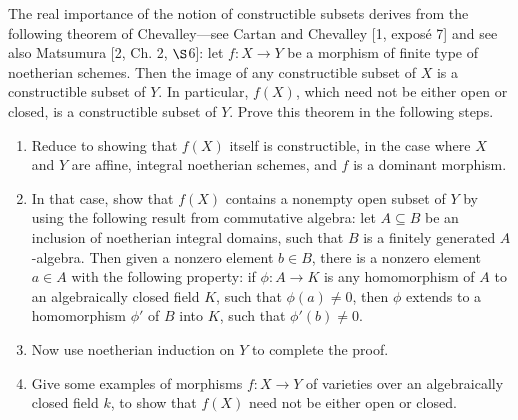 \begin{exercise}%
	The real importance of the notion of constructible subsets derives from the following theorem of Chevalley---see Cartan and Chevalley [1, expos\'e 7] and see also Matsumura [2, Ch. 2, $\S $6]: let $f:X \to Y$ be a morphism of finite type of noetherian schemes. Then the image of any constructible subset of $X$ is a constructible subset of $Y$. In particular, $f(X)$, which need not be either open or closed, is a constructible subset of $Y$. Prove this theorem in the following steps. 
	\begin{enumerate}
		\item Reduce to showing that $f(X)$ itself is constructible, in the case where $X$ and $Y$ are affine, integral noetherian schemes, and $f$ is a dominant morphism. 
		\item In that case, show that $f(X)$ contains a nonempty open subset of $Y$ by using the following result from commutative algebra: let $A \subseteq B$ be an inclusion of noetherian integral domains, such that $B$ is a finitely generated $A$-algebra. Then given a nonzero element $b \in B$, there is a nonzero element $a \in A$ with the following property: if $\phi: A \to K$ is any homomorphism of $A$ to an algebraically closed field $K$, such that $\phi(a) \ne 0$, then $\phi$ extends to a homomorphism $\phi'$ of $B$ into $K$, such that $\phi'(b) \ne 0$. 
			\ifhint
				[Hint: Prove this algebraic result by induction on the number of generators of $B$ over $A$. For the case of one generator, prove the result directly. In the application, take $b = 1$.] 
			\fi
		\item Now use noetherian induction on $Y$ to complete the proof. 
		\item Give some examples of morphisms $f: X \to Y$ of varieties over an algebraically closed field $k$, to show that $f(X)$ need not be either open or closed. 
	\end{enumerate}
\end{exercise}
